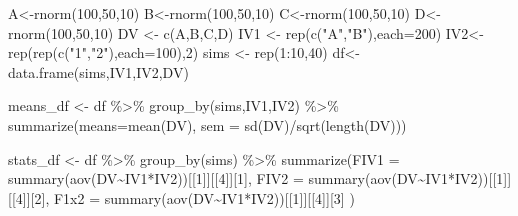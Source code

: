 \documentclass[
  letterpaper,
  DIV=11,
  numbers=noendperiod]{scrreprt}
\newenvironment{Shaded}{\begin{snugshade}}{\end{snugshade}}
\newcommand{\AttributeTok}[1]{\textcolor[rgb]{0.40,0.45,0.13}{#1}}
\newcommand{\DecValTok}[1]{\textcolor[rgb]{0.68,0.00,0.00}{#1}}
\newcommand{\FunctionTok}[1]{\textcolor[rgb]{0.28,0.35,0.67}{#1}}
\newcommand{\NormalTok}[1]{\textcolor[rgb]{0.00,0.23,0.31}{#1}}
\newcommand{\OtherTok}[1]{\textcolor[rgb]{0.00,0.23,0.31}{#1}}
\newcommand{\SpecialCharTok}[1]{\textcolor[rgb]{0.37,0.37,0.37}{#1}}
\newcommand{\StringTok}[1]{\textcolor[rgb]{0.13,0.47,0.30}{#1}}
\begin{document}
\begin{Shaded}
\begin{Highlighting}[]
\NormalTok{A}\OtherTok{\textless{}{-}}\FunctionTok{rnorm}\NormalTok{(}\DecValTok{100}\NormalTok{,}\DecValTok{50}\NormalTok{,}\DecValTok{10}\NormalTok{)}
\NormalTok{B}\OtherTok{\textless{}{-}}\FunctionTok{rnorm}\NormalTok{(}\DecValTok{100}\NormalTok{,}\DecValTok{50}\NormalTok{,}\DecValTok{10}\NormalTok{)}
\NormalTok{C}\OtherTok{\textless{}{-}}\FunctionTok{rnorm}\NormalTok{(}\DecValTok{100}\NormalTok{,}\DecValTok{50}\NormalTok{,}\DecValTok{10}\NormalTok{)}
\NormalTok{D}\OtherTok{\textless{}{-}}\FunctionTok{rnorm}\NormalTok{(}\DecValTok{100}\NormalTok{,}\DecValTok{50}\NormalTok{,}\DecValTok{10}\NormalTok{)}
\NormalTok{DV }\OtherTok{\textless{}{-}} \FunctionTok{c}\NormalTok{(A,B,C,D)}
\NormalTok{IV1 }\OtherTok{\textless{}{-}} \FunctionTok{rep}\NormalTok{(}\FunctionTok{c}\NormalTok{(}\StringTok{"A"}\NormalTok{,}\StringTok{"B"}\NormalTok{),}\AttributeTok{each=}\DecValTok{200}\NormalTok{)}
\NormalTok{IV2}\OtherTok{\textless{}{-}}\FunctionTok{rep}\NormalTok{(}\FunctionTok{rep}\NormalTok{(}\FunctionTok{c}\NormalTok{(}\StringTok{"1"}\NormalTok{,}\StringTok{"2"}\NormalTok{),}\AttributeTok{each=}\DecValTok{100}\NormalTok{),}\DecValTok{2}\NormalTok{)}
\NormalTok{sims }\OtherTok{\textless{}{-}} \FunctionTok{rep}\NormalTok{(}\DecValTok{1}\SpecialCharTok{:}\DecValTok{10}\NormalTok{,}\DecValTok{40}\NormalTok{)}
\NormalTok{df}\OtherTok{\textless{}{-}}\FunctionTok{data.frame}\NormalTok{(sims,IV1,IV2,DV)}

\NormalTok{means\_df }\OtherTok{\textless{}{-}}\NormalTok{ df }\SpecialCharTok{\%\textgreater{}\%}
  \FunctionTok{group\_by}\NormalTok{(sims,IV1,IV2) }\SpecialCharTok{\%\textgreater{}\%}
  \FunctionTok{summarize}\NormalTok{(}\AttributeTok{means=}\FunctionTok{mean}\NormalTok{(DV),}
            \AttributeTok{sem =} \FunctionTok{sd}\NormalTok{(DV)}\SpecialCharTok{/}\FunctionTok{sqrt}\NormalTok{(}\FunctionTok{length}\NormalTok{(DV)))}

\NormalTok{stats\_df }\OtherTok{\textless{}{-}}\NormalTok{ df }\SpecialCharTok{\%\textgreater{}\%}
  \FunctionTok{group\_by}\NormalTok{(sims) }\SpecialCharTok{\%\textgreater{}\%}
  \FunctionTok{summarize}\NormalTok{(}\AttributeTok{FIV1 =} \FunctionTok{summary}\NormalTok{(}\FunctionTok{aov}\NormalTok{(DV}\SpecialCharTok{\textasciitilde{}}\NormalTok{IV1}\SpecialCharTok{*}\NormalTok{IV2))[[}\DecValTok{1}\NormalTok{]][[}\DecValTok{4}\NormalTok{]][}\DecValTok{1}\NormalTok{],}
            \AttributeTok{FIV2 =} \FunctionTok{summary}\NormalTok{(}\FunctionTok{aov}\NormalTok{(DV}\SpecialCharTok{\textasciitilde{}}\NormalTok{IV1}\SpecialCharTok{*}\NormalTok{IV2))[[}\DecValTok{1}\NormalTok{]][[}\DecValTok{4}\NormalTok{]][}\DecValTok{2}\NormalTok{],}
            \AttributeTok{F1x2 =} \FunctionTok{summary}\NormalTok{(}\FunctionTok{aov}\NormalTok{(DV}\SpecialCharTok{\textasciitilde{}}\NormalTok{IV1}\SpecialCharTok{*}\NormalTok{IV2))[[}\DecValTok{1}\NormalTok{]][[}\DecValTok{4}\NormalTok{]][}\DecValTok{3}\NormalTok{]}
\NormalTok{            )}


\end{Highlighting}
\end{Shaded}
\end{document}
